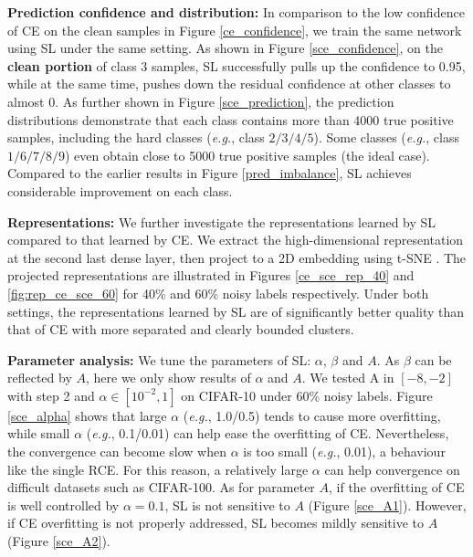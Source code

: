 \documentclass[10pt,twocolumn,letterpaper]{article}
\begin{document}
\noindent\textbf{Prediction confidence and distribution:} 
In comparison to the low confidence of CE on the clean samples in Figure \ref{ce_confidence}, we train the same network using SL under the same setting. As shown in Figure \ref{sce_confidence}, on the \textbf{clean portion} of class 3 samples, SL successfully pulls up the confidence to 0.95, while at the same time, pushes down the residual confidence at other classes to almost 0. As further shown in Figure \ref{sce_prediction}, the prediction distributions demonstrate that each class contains more than 4000 true positive samples, including the hard classes (\textit{e.g.}, class $2/3/4/5$).  Some classes (\textit{e.g.}, class $1/6/7/8/9$) even obtain close to 5000 true positive samples (the ideal case). Compared to the earlier results in Figure \ref{pred_imbalance}, SL achieves considerable improvement on each class. 

\noindent\textbf{Representations:} 
We further investigate the representations learned by SL compared to that learned by CE. We extract the high-dimensional representation at the second last dense layer, then project to a 2D embedding using t-SNE \cite{maaten2008visualizing}. The projected representations are illustrated in Figures \ref{ce_sce_rep_40} and \ref{fig:rep_ce_sce_60} for 40\% and 60\% noisy labels respectively. Under both settings, the representations learned by SL are of significantly better quality than that of CE with more separated and clearly bounded clusters.  

\noindent\textbf{Parameter analysis:}
We tune the parameters of SL: $\alpha$, $\beta$ and $A$. As $\beta$ can be reflected by $A$, here we only show results of $\alpha$ and $A$. We tested A in $[-8, -2]$ with step 2 and $\alpha \in [10^{-2}, 1]$ on CIFAR-10 under 60\% noisy labels. Figure \ref{sce_alpha} shows that large $\alpha$ (\textit{e.g.}, 1.0/0.5) tends to cause more overfitting, while small $\alpha$ (\textit{e.g.}, 0.1/0.01) can help ease the overfitting of CE. Nevertheless, the convergence can become slow when $\alpha$ is too small (\textit{e.g.}, 0.01), a behaviour like the single RCE. For this reason, a relatively large $\alpha$ can help convergence on difficult datasets such as CIFAR-100. As for parameter $A$, if the overfitting of CE is well controlled by $\alpha=0.1$, SL is not sensitive to $A$ (Figure \ref{sce_A1}). However, if CE overfitting is not properly addressed, SL becomes mildly sensitive to $A$ (Figure \ref{sce_A2}).
\end{document}
